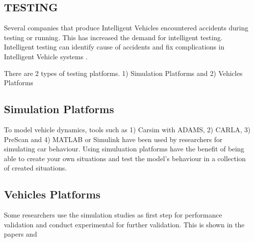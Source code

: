 \begin{spacing}{1.5} 
\begin{sloppypar}
\section{TESTING}
Several companies that produce Intelligent Vehicles encountered accidents during testing or running. This has increased the demand for intelligent testing. Intelligent testing can identify cause of accidents and fix complications in Intelligent Vehicle systems \cite{chen2023milestones}.

There are 2 types of testing platforms. 1) Simulation Platforms and 2) Vehicles Platforms

\subsection{Simulation Platforms}
To model vehicle dynamics, tools such as 1) Carsim with ADAMS, 2) CARLA, 3) PreScan and 4) MATLAB or Simulink have been used by researchers for simulating car behaviour. Using simuluation platforms have the benefit of being able to create your own situations and test the model's behaviour in a collection of created situations.  

\subsection{Vehicles Platforms}
Some researchers use the simulation studies as first step for performance validation and conduct experimental for further validation. This is shown in the papers \cite{muller2005off} and  \cite{arifin2022steering}
\end{sloppypar}
 \end{spacing}

